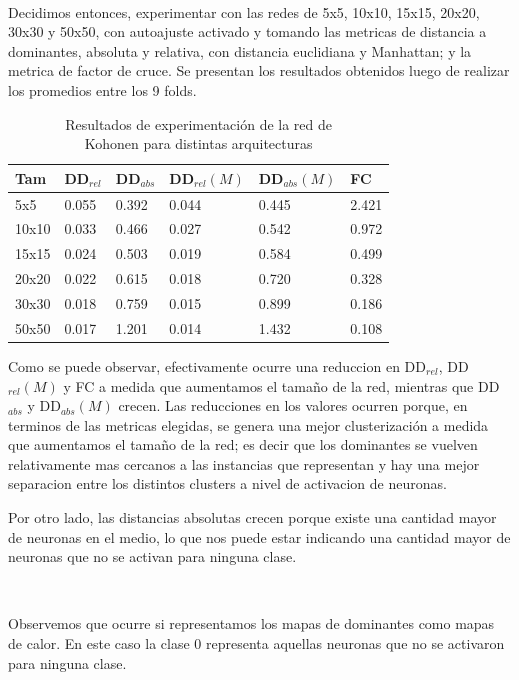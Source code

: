\documentclass[informe.tex]{subfiles}
\begin{document}
       ~
       
       Decidimos entonces, experimentar con las redes de 5x5, 10x10, 15x15, 20x20, 30x30 y 50x50, con autoajuste activado y tomando las metricas de distancia a dominantes, absoluta y relativa, con distancia euclidiana y Manhattan; y la metrica de factor de cruce. Se presentan los resultados obtenidos luego de realizar los promedios entre los 9 folds.
       
       \begin{table}[H]
	  \centering
	  \begin{tabular}{|l|l|l|l|l|l|} \hline
	  Tam & DD$_{rel}$ & DD$_{abs}$ & DD$_{rel}(M)$ & DD$_{abs}(M)$  & FC \\ \hline
	  5x5    & 0.055 & 0.392 & 0.044 & 0.445 & 2.421 \\ \hline
	  10x10  & 0.033 & 0.466 & 0.027 & 0.542 & 0.972 \\ \hline
	  15x15  & 0.024 & 0.503 & 0.019 & 0.584 & 0.499 \\ \hline
	  20x20  & 0.022 & 0.615 & 0.018 & 0.720 & 0.328 \\ \hline
	  30x30  & 0.018 & 0.759 & 0.015 & 0.899 & 0.186 \\ \hline
	  50x50  & 0.017 & 1.201 & 0.014 & 1.432 & 0.108 \\ \hline
	  \end{tabular}
	  \caption{Resultados de experimentaci\'on de la red de \\ Kohonen para distintas arquitecturas}
	  \label{tab:resultados_kohonen}
	\end{table}
	
	Como se puede observar, efectivamente ocurre una reduccion en DD$_{rel}$, DD$_{rel}(M)$ y FC a medida que aumentamos el tama\~no de la red, mientras que DD$_{abs}$ y DD$_{abs}(M)$ crecen. Las reducciones en los valores ocurren porque, en terminos de las metricas elegidas, se genera una mejor clusterizaci\'on a medida que aumentamos el tama\~no de la red; es decir que los dominantes se vuelven relativamente mas cercanos a las instancias que representan y hay una mejor separacion entre los distintos clusters a nivel de activacion de neuronas. 
	
	Por otro lado, las distancias absolutas crecen porque existe una cantidad mayor de neuronas en el medio, lo que nos puede estar indicando una cantidad mayor de neuronas que no se activan para ninguna clase.
	
	~
	
	Observemos que ocurre si representamos los mapas de dominantes como mapas de calor. En este caso la clase 0 representa aquellas neuronas que no se activaron para ninguna clase.
	
\end{document}
